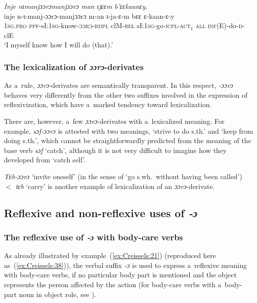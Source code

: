 \documentclass[output=paper]{langscibook}
\begin{document}
\ea
  \label{ex:Creissels:37}
  
    \textit{Inje nɩmanjɔɔrɔmanjɔɔrɔ man ɩjɛɛm b'ɛɛkaanɛy.}\\
    \gll inje n-ɩ-manj-ɔɔrɔ-manjɔɔrɔ m-an ɩ-ja-ɛ-m bɛɛ ɛ-kaan-ɛ-y\\
    \textsc{1sg.pro} \textsc{ppf}-sI:\textsc{1sg}-know-\textsc{ɔɔrɔ-rdpl}
    clM-\textsc{rel} sI:\textsc{1sg}-go-\textsc{icpl-act$_1$} \textsc{all}
    \textsc{inf}(E)-do-\textsc{d}-clE\\
    \glt `I myself know how I will do (that).'

\z

\subsubsection{The lexicalization of \textit{ɔɔrɔ}-derivates}%
\label{sec:Creissels:ooro-lexicalization}

As a~rule, \textit{ɔɔrɔ}-derivates are semantically transparent.  In this
respect, \textit{‑ɔɔrɔ} behaves very differently from the other two suffixes
involved in the expression of reflexivization, which have a~marked tendency
toward lexicalization.

There are, however, a~few \textit{ɔɔrɔ}-derivates with a~lexicalized meaning.
For example, \textit{sɔf-ɔɔrɔ} is attested with two meanings, `strive to do
s.th.'  and `keep from doing s.th.', which cannot be straightforwardly
predicted from the meaning of the base verb \textit{sɔf} `catch', although it is
not very difficult to imagine how they developed from `catch self'.

\textit{Tɛb-ɔɔrɔ} `invite oneself' (in the sense of `go s.wh.\ without having
been called') $<$ \textit{tɛb} `carry' is another example of lexicalization of an
\textit{ɔɔrɔ}-derivate.

\subsection{Reflexive and non-reflexive uses of \textit{‑ɔ}}%
\label{sec:Creissels:o}

\subsubsection{The reflexive use of \textit{‑ɔ} with body-care verbs}%
\label{sec:Creissels:o-bodycare}

As already illustrated by example~(\ref{ex:Creissels:21}) (reproduced here
as~(\ref{ex:Creissels:38})), the verbal suffix \textit{‑ɔ} is used to express
a~reflexive meaning with body-care verbs, if no particular body part is
mentioned and the object represents the person affected by the action (for
body-care verbs with a~body-part noun in object role, see
).
\end{document}
